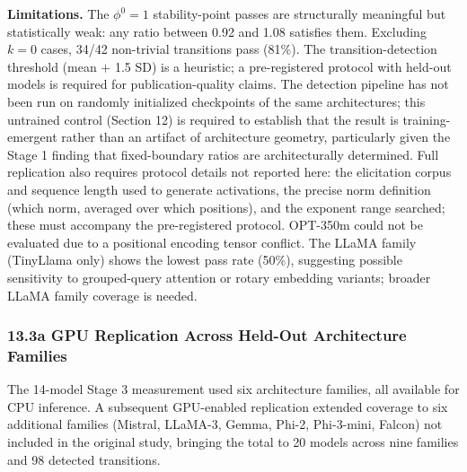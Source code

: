 \documentclass[
  11pt,
  letterpaper,
]{article}
\begin{document}
\textbf{Limitations.} The \(\phi^0 = 1\) stability-point passes are
structurally meaningful but statistically weak: any ratio between 0.92
and 1.08 satisfies them. Excluding \(k=0\) cases, 34/42 non-trivial
transitions pass (81\%). The transition-detection threshold (mean \(+\)
1.5 SD) is a heuristic; a pre-registered protocol with held-out models
is required for publication-quality claims. The detection pipeline has
not been run on randomly initialized checkpoints of the same
architectures; this untrained control (Section 12) is required to
establish that the result is training-emergent rather than an artifact
of architecture geometry, particularly given the Stage 1 finding that
fixed-boundary ratios are architecturally determined. Full replication
also requires protocol details not reported here: the elicitation corpus
and sequence length used to generate activations, the precise norm
definition (which norm, averaged over which positions), and the exponent
range searched; these must accompany the pre-registered protocol.
OPT-350m could not be evaluated due to a positional encoding tensor
conflict. The LLaMA family (TinyLlama only) shows the lowest pass rate
(50\%), suggesting possible sensitivity to grouped-query attention or
rotary embedding variants; broader LLaMA family coverage is needed.

\subsubsection{13.3a GPU Replication Across Held-Out Architecture
Families}\label{a-gpu-replication-across-held-out-architecture-families}

The 14-model Stage 3 measurement used six architecture families, all
available for CPU inference. A subsequent GPU-enabled replication
extended coverage to six additional families (Mistral, LLaMA-3, Gemma,
Phi-2, Phi-3-mini, Falcon) not included in the original study, bringing
the total to 20 models across nine families and 98 detected transitions.
\end{document}
